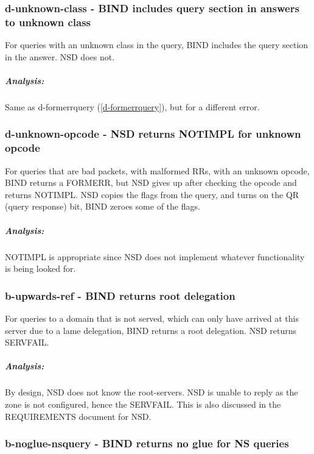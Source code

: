 \documentclass[twoside,titlepage,english]{nlnetlabs}
\begin{document}
\subsubsection{d-unknown-class - BIND includes query section in answers to unknown class}
\label{d-unknown-class}

For queries with an unknown class in the query, BIND includes the query section
in the answer. NSD does not.

\vspace{-8pt}\subparagraph{Analysis:}

Same as d-formerrquery (\ref{d-formerrquery}), but for a different error.


\subsubsection{d-unknown-opcode - NSD returns NOTIMPL for unknown opcode}
\label{d-unknown-opcode}

For queries that are bad packets, with malformed RRs, with an unknown opcode,
BIND returns a FORMERR, but NSD gives up after checking the opcode and
returns NOTIMPL.  NSD copies the flags from the query, and turns on the 
QR (query response) bit, BIND zeroes some of the flags.

\vspace{-8pt}\subparagraph{Analysis:}

NOTIMPL is appropriate since NSD does not implement whatever functionality
is being looked for. 


\subsubsection{b-upwards-ref - BIND returns root delegation}
\label{b-upwards-ref}

For queries to a domain that is not served, which can only have arrived at
this server due to a lame delegation, BIND returns a root delegation. NSD
returns SERVFAIL.

\vspace{-8pt}\subparagraph{Analysis:}

By design, NSD does not know the root-servers.  NSD is unable to reply as
the zone is not configured, hence the SERVFAIL. This is also discussed in
the REQUIREMENTS document for NSD.


\subsubsection{b-noglue-nsquery - BIND returns no glue for NS queries}
\label{b-noglue-nsquery}
\end{document}

